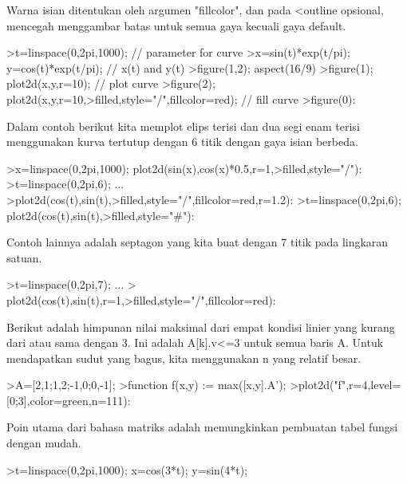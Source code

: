 \documentclass[a4paper,10pt]{article}
\begin{document}
\begin{eulernotebook}
\begin{eulercomment}
\begin{eulercomment}
\begin{eulercomment}
\begin{eulercomment}
\begin{eulercomment}
\begin{eulercomment}
\begin{eulercomment}
\begin{eulercomment}
\begin{eulercomment}
\begin{eulercomment}
\begin{eulercomment}
Warna isian ditentukan oleh argumen "fillcolor", dan pada \textless{}outline
opsional, mencegah menggambar batas untuk semua gaya kecuali gaya
default.
\end{eulercomment}
\begin{eulerprompt}
>t=linspace(0,2pi,1000); // parameter for curve
>x=sin(t)*exp(t/pi); y=cos(t)*exp(t/pi); // x(t) and y(t)
>figure(1,2); aspect(16/9)
>figure(1); plot2d(x,y,r=10); // plot curve
>figure(2); plot2d(x,y,r=10,>filled,style="/",fillcolor=red); // fill curve
>figure(0):
\end{eulerprompt}
\begin{eulercomment}
Dalam contoh berikut kita memplot elips terisi dan dua segi enam
terisi menggunakan kurva tertutup dengan 6 titik dengan gaya isian
berbeda.
\end{eulercomment}
\begin{eulerprompt}
>x=linspace(0,2pi,1000); plot2d(sin(x),cos(x)*0.5,r=1,>filled,style="/"):
>t=linspace(0,2pi,6); ...
>plot2d(cos(t),sin(t),>filled,style="/",fillcolor=red,r=1.2):
>t=linspace(0,2pi,6); plot2d(cos(t),sin(t),>filled,style="#"):
\end{eulerprompt}
\begin{eulercomment}
Contoh lainnya adalah septagon yang kita buat dengan 7 titik pada
lingkaran satuan.
\end{eulercomment}
\begin{eulerprompt}
>t=linspace(0,2pi,7);  ...
> plot2d(cos(t),sin(t),r=1,>filled,style="/",fillcolor=red):
\end{eulerprompt}
\begin{eulercomment}
Berikut adalah himpunan nilai maksimal dari empat kondisi linier yang
kurang dari atau sama dengan 3. Ini adalah A[k].v\textless{}=3 untuk semua baris
A. Untuk mendapatkan sudut yang bagus, kita menggunakan n yang relatif
besar.
\end{eulercomment}
\begin{eulerprompt}
>A=[2,1;1,2;-1,0;0,-1];
>function f(x,y) := max([x,y].A');
>plot2d("f",r=4,level=[0;3],color=green,n=111):
\end{eulerprompt}
\begin{eulercomment}
Poin utama dari bahasa matriks adalah memungkinkan pembuatan tabel
fungsi dengan mudah.
\end{eulercomment}
\begin{eulerprompt}
>t=linspace(0,2pi,1000); x=cos(3*t); y=sin(4*t);
\end{eulerprompt}
\begin{eulercomment}

\end{eulercomment}
\end{eulercomment}
\end{eulercomment}
\end{eulercomment}
\end{eulercomment}
\end{eulercomment}
\end{eulercomment}
\end{eulercomment}
\end{eulercomment}
\end{eulercomment}
\end{eulercomment}
\end{eulernotebook}
\end{document}
